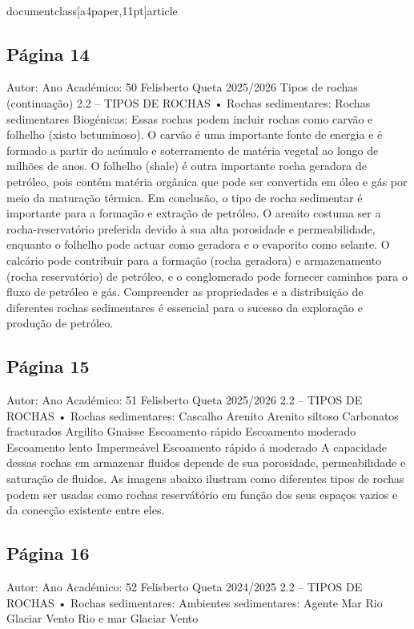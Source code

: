 \\documentclass[a4paper,11pt]{article}
\begin{document}
\subsection*{Página 14}
Autor:
Ano Académico:
50
Felisberto Queta
2025/2026
Tipos de rochas (continuação)
2.2 – TIPOS DE ROCHAS
•
Rochas sedimentares: 
Rochas sedimentares Biogénicas: 
Essas rochas podem incluir rochas como carvão e folhelho
(xisto betuminoso). O carvão é uma importante fonte de 
energia e é formado a partir do acúmulo e soterramento de 
matéria vegetal ao longo de milhões de anos. O folhelho 
(shale) é outra importante rocha geradora de petróleo, pois 
contém matéria orgânica que pode ser convertida em óleo e gás 
por meio da maturação térmica.
Em conclusão, o tipo de rocha sedimentar é importante para a
formação e extração de petróleo. O arenito costuma ser a
rocha-reservatório preferida devido à sua alta porosidade e
permeabilidade,
enquanto
o
folhelho
pode
actuar
como
geradora e o evaporito como selante. O calcário pode
contribuir para a formação (rocha geradora) e armazenamento
(rocha reservatório) de petróleo, e o conglomerado pode
fornecer caminhos para o fluxo de petróleo e gás. Compreender
as
propriedades
e
a
distribuição
de
diferentes
rochas
sedimentares é essencial para o sucesso da exploração e
produção de petróleo.



\subsection*{Página 15}
Autor:
Ano Académico:
51
Felisberto Queta
2025/2026
2.2 – TIPOS DE ROCHAS
•
Rochas sedimentares: 
Cascalho
Arenito
Arenito siltoso
Carbonatos fracturados
Argilito
Gnaisse
Escoamento rápido
Escoamento 
moderado
Escoamento 
lento
Impermeável
Escoamento 
rápido á moderado
A capacidade dessas rochas em armazenar fluidos depende de sua porosidade, permeabilidade e 
saturação de fluidos. 
As imagens abaixo ilustram como diferentes tipos de rochas podem ser usadas como rochas 
reservátório em função dos seus espaços vazios e da conecção existente entre eles.



\subsection*{Página 16}
Autor:
Ano Académico:
52
Felisberto Queta
2024/2025
2.2 – TIPOS DE ROCHAS
•
Rochas sedimentares: 
Ambientes sedimentares: 
Agente
Mar
Rio
Glaciar
Vento
Rio e mar
Glaciar
Vento
\end{document}
